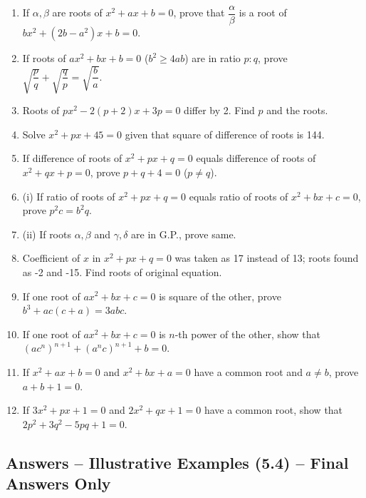 \documentclass[12pt,a4paper]{article}
\begin{document}
\begin{enumerate}[label=Example \arabic*.]
    \item If \( \alpha, \beta \) are roots of \( x^2 + ax + b = 0 \), prove that \( \dfrac{\alpha}{\beta} \) is a root of \( bx^2 + (2b - a^2)x + b = 0 \).

    \item If roots of \( ax^2 + bx + b = 0 \) (\( b^2 \geq 4ab \)) are in ratio \( p:q \), prove \( \sqrt{\dfrac{p}{q}} + \sqrt{\dfrac{q}{p}} = \sqrt{\dfrac{b}{a}} \).

    \item Roots of \( px^2 - 2(p+2)x + 3p = 0 \) differ by 2. Find \( p \) and the roots.

    \item Solve \( x^2 + px + 45 = 0 \) given that square of difference of roots is 144.

    \item If difference of roots of \( x^2 + px + q = 0 \) equals difference of roots of \( x^2 + qx + p = 0 \), prove \( p + q + 4 = 0 \) (\( p \neq q \)).

    \item (i) If ratio of roots of \( x^2 + px + q = 0 \) equals ratio of roots of \( x^2 + bx + c = 0 \), prove \( p^2 c = b^2 q \).
    \item (ii) If roots \( \alpha,\beta \) and \( \gamma,\delta \) are in G.P., prove same.

    \item Coefficient of \( x \) in \( x^2 + px + q = 0 \) was taken as 17 instead of 13; roots found as -2 and -15. Find roots of original equation.

    \item If one root of \( ax^2 + bx + c = 0 \) is square of the other, prove \( b^3 + ac(c + a) = 3abc \).

    \item If one root of \( ax^2 + bx + c = 0 \) is \( n \)-th power of the other, show that \( (ac^n)^{n+1} + (a^n c)^{n+1} + b = 0 \).

    \item If \( x^2 + ax + b = 0 \) and \( x^2 + bx + a = 0 \) have a common root and \( a \neq b \), prove \( a + b + 1 = 0 \).

    \item If \( 3x^2 + px + 1 = 0 \) and \( 2x^2 + qx + 1 = 0 \) have a common root, show that \( 2p^2 + 3q^2 - 5pq + 1 = 0 \).
\end{enumerate}

\subsection{Answers -- Illustrative Examples (5.4) -- Final Answers Only}
\end{document}
